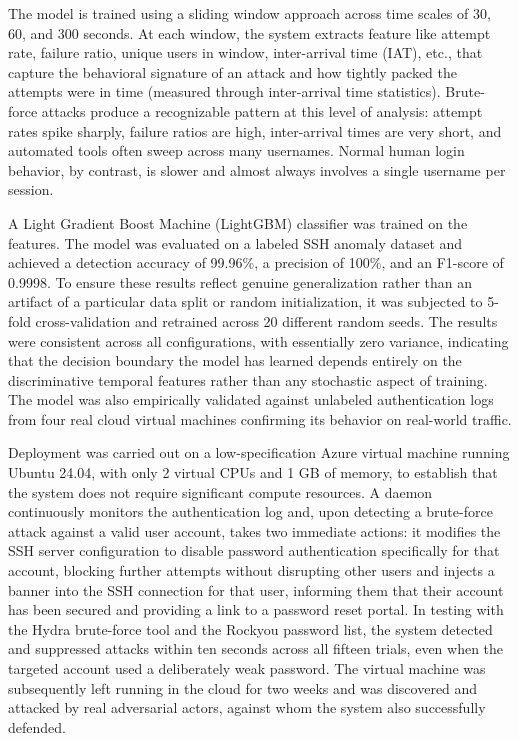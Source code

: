 \documentclass[conference]{IEEEtran}
\begin{document}
The model is trained using a sliding window approach across time scales of 30, 60, and 300 seconds. At each window, the system extracts feature like attempt rate, failure ratio, unique users in window, inter-arrival time (IAT), etc., that capture the behavioral signature of an attack and how tightly packed the attempts were in time (measured through inter-arrival time statistics). Brute-force attacks produce a recognizable pattern at this level of analysis: attempt rates spike sharply, failure ratios are high, inter-arrival times are very short, and automated tools often sweep across many usernames. Normal human login behavior, by contrast, is slower and almost always involves a single username per session.

A Light Gradient Boost Machine (LightGBM) classifier was trained on the features. The model was evaluated on a labeled SSH anomaly dataset and achieved a detection accuracy of 99.96\%, a precision of 100\%, and an F1-score of 0.9998. To ensure these results reflect genuine generalization rather than an artifact of a particular data split or random initialization, it was subjected to 5-fold cross-validation and retrained across 20 different random seeds. The results were consistent across all configurations, with essentially zero variance, indicating that the decision boundary the model has learned depends entirely on the discriminative temporal features rather than any stochastic aspect of training. The model was also empirically validated against unlabeled authentication logs from four real cloud virtual machines confirming its behavior on real-world traffic.

Deployment was carried out on a low-specification Azure virtual machine running Ubuntu 24.04, with only 2 virtual CPUs and 1 GB of memory, to establish that the system does not require significant compute resources. A daemon continuously monitors the authentication log and, upon detecting a brute-force attack against a valid user account, takes two immediate actions: it modifies the SSH server configuration to disable password authentication specifically for that account, blocking further attempts without disrupting other users and injects a banner into the SSH connection for that user, informing them that their account has been secured and providing a link to a password reset portal. In testing with the Hydra brute-force tool and the Rockyou password list, the system detected and suppressed attacks within ten seconds across all fifteen trials, even when the targeted account used a deliberately weak password. The virtual machine was subsequently left running in the cloud for two weeks and was discovered and attacked by real adversarial actors, against whom the system also successfully defended.
\end{document}

